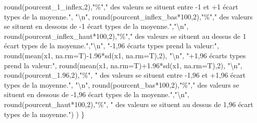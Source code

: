 \documentclass[
]{book}
\newenvironment{Shaded}{\begin{snugshade}}{\end{snugshade}}
\newcommand{\AttributeTok}[1]{\textcolor[rgb]{0.77,0.63,0.00}{#1}}
\newcommand{\DecValTok}[1]{\textcolor[rgb]{0.00,0.00,0.81}{#1}}
\newcommand{\FloatTok}[1]{\textcolor[rgb]{0.00,0.00,0.81}{#1}}
\newcommand{\FunctionTok}[1]{\textcolor[rgb]{0.00,0.00,0.00}{#1}}
\newcommand{\NormalTok}[1]{#1}
\newcommand{\SpecialCharTok}[1]{\textcolor[rgb]{0.00,0.00,0.00}{#1}}
\newcommand{\StringTok}[1]{\textcolor[rgb]{0.31,0.60,0.02}{#1}}
\begin{document}
\begin{Shaded}
\begin{Highlighting}[]
                \FunctionTok{round}\NormalTok{(pourcent\_1\_inflex,}\DecValTok{2}\NormalTok{),}\StringTok{"\%"}\NormalTok{,}\StringTok{" des valeurs se situent entre {-}1 et +1 écart types de la moyenne."}\NormalTok{, }\StringTok{"}\SpecialCharTok{\textbackslash{}n}\StringTok{"}\NormalTok{,}
                \FunctionTok{round}\NormalTok{(pourcent\_inflex\_bas}\SpecialCharTok{*}\DecValTok{100}\NormalTok{,}\DecValTok{2}\NormalTok{),}\StringTok{"\%"}\NormalTok{,}\StringTok{" des valeurs se situent en dessous de {-}1 écart types de la moyenne."}\NormalTok{,}\StringTok{"}\SpecialCharTok{\textbackslash{}n}\StringTok{"}\NormalTok{,}
                \FunctionTok{round}\NormalTok{(pourcent\_inflex\_haut}\SpecialCharTok{*}\DecValTok{100}\NormalTok{,}\DecValTok{2}\NormalTok{),}\StringTok{"\%"}\NormalTok{,}\StringTok{" des valeurs se situent au dessus de 1 écart types de la moyenne."}\NormalTok{,}\StringTok{"}\SpecialCharTok{\textbackslash{}n}\StringTok{"}\NormalTok{,}
                \StringTok{"{-}1,96 écarts types prend la valeur:"}\NormalTok{, }\FunctionTok{round}\NormalTok{(}\FunctionTok{mean}\NormalTok{(x1, }\AttributeTok{na.rm=}\NormalTok{T)}\SpecialCharTok{{-}}\FloatTok{1.96}\SpecialCharTok{*}\FunctionTok{sd}\NormalTok{(x1, }\AttributeTok{na.rm=}\NormalTok{T),}\DecValTok{2}\NormalTok{), }\StringTok{"}\SpecialCharTok{\textbackslash{}n}\StringTok{"}\NormalTok{,}
                \StringTok{"+1,96 écarts types prend la valeur:"}\NormalTok{, }\FunctionTok{round}\NormalTok{(}\FunctionTok{mean}\NormalTok{(x1, }\AttributeTok{na.rm=}\NormalTok{T)}\SpecialCharTok{+}\FloatTok{1.96}\SpecialCharTok{*}\FunctionTok{sd}\NormalTok{(x1, }\AttributeTok{na.rm=}\NormalTok{T),}\DecValTok{2}\NormalTok{), }\StringTok{"}\SpecialCharTok{\textbackslash{}n}\StringTok{"}\NormalTok{,}
                \FunctionTok{round}\NormalTok{(pourcent\_1}\FloatTok{.96}\NormalTok{,}\DecValTok{2}\NormalTok{),}\StringTok{"\%"}\NormalTok{, }\StringTok{" des valeurs se situent entre {-}1,96 et +1,96 écart types de la moyenne."}\NormalTok{, }\StringTok{"}\SpecialCharTok{\textbackslash{}n}\StringTok{"}\NormalTok{,}
                \FunctionTok{round}\NormalTok{(pourcent\_bas}\SpecialCharTok{*}\DecValTok{100}\NormalTok{,}\DecValTok{2}\NormalTok{),}\StringTok{"\%"}\NormalTok{,}\StringTok{" des valeurs se situent en dessous de {-}1,96 écart types de la moyenne."}\NormalTok{,}\StringTok{"}\SpecialCharTok{\textbackslash{}n}\StringTok{"}\NormalTok{,}
                \FunctionTok{round}\NormalTok{(pourcent\_haut}\SpecialCharTok{*}\DecValTok{100}\NormalTok{,}\DecValTok{2}\NormalTok{),}\StringTok{"\%"}\NormalTok{, }\StringTok{" des valeurs se situent au dessus de 1,96 écart types de la moyenne."}\NormalTok{)}
\NormalTok{  )}
\NormalTok{\}}
\end{Highlighting}
\end{Shaded}
\end{document}
